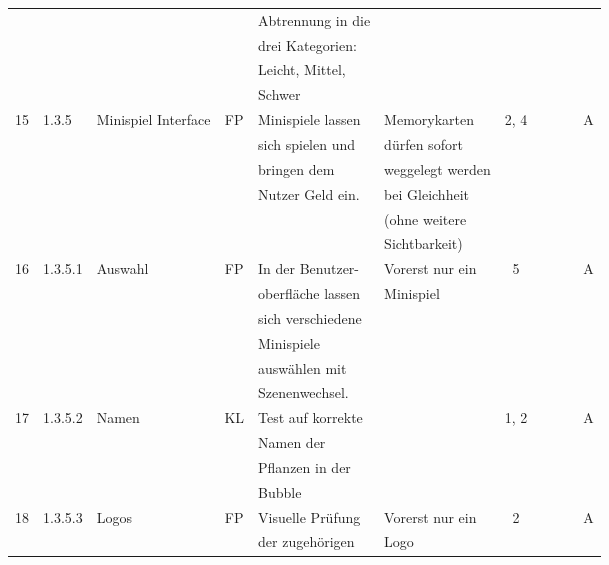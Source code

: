 \begin{longtable}{|c|l|l|c|l|l|c|c|l|l|l|}
            &       &            &    & Abtrennung in die &   &   & & & &\\
            &       &            &    & drei Kategorien: &   &   & & & &\\
            &       &            &    & Leicht, Mittel, &   &   & & & &\\
            &       &            &    & Schwer &   &   & & & &\\
            \hline
            15 & 1.3.5 & Minispiel Interface & FP & Minispiele lassen & Memorykarten & 2, 4 &  &  &  & A \\
            &       &            &    & sich spielen und & dürfen sofort  &   & & & &\\
            &       &            &    & bringen dem & weggelegt werden  &   & & & &\\
            &       &            &    & Nutzer Geld ein. & bei Gleichheit  &   & & & &\\
            &       &            &    &  &  (ohne weitere &   & & & &\\
            &       &            &    &  & Sichtbarkeit)  &   & & & &\\
            \hline
            16 & 1.3.5.1 & Auswahl & FP & In der Benutzer- & Vorerst nur ein & 5 &  &  &  & A \\
            &       &            &    & oberfläche lassen &  Minispiel &   & & & &\\
            &       &            &    & sich verschiedene &   &   & & & &\\
            &       &            &    & Minispiele &   &   & & & &\\
            &       &            &    & auswählen mit &   &   & & & &\\
            &       &            &    & Szenenwechsel. &   &   & & & &\\
            \hline
            17 & 1.3.5.2 & Namen & KL & Test auf korrekte &  & 1, 2 &  &  &  & A \\
            &       &            &    & Namen der &   &   & & & &\\
            &       &            &    & Pflanzen in der &   &   & & & &\\
            &       &            &    & Bubble &   &   & & & &\\
            \hline
            18 & 1.3.5.3 & Logos & FP & Visuelle Prüfung & Vorerst nur ein & 2 &  &  &  & A \\
            &       &            &    & der zugehörigen &  Logo &   & & & &\\

\end{longtable}
